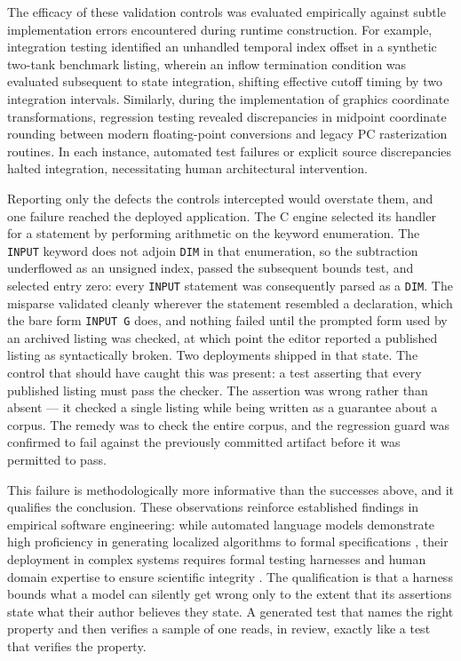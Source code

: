 \documentclass[3p,times,authoryear,twocolumn]{elsarticle}
\begin{document}
The efficacy of these validation controls was evaluated empirically against subtle implementation errors encountered during runtime construction. For example, integration testing identified an unhandled temporal index offset in a synthetic two-tank benchmark listing, wherein an inflow termination condition was evaluated subsequent to state integration, shifting effective cutoff timing by two integration intervals. Similarly, during the implementation of graphics coordinate transformations, regression testing revealed discrepancies in midpoint coordinate rounding between modern floating-point conversions and legacy PC rasterization routines. In each instance, automated test failures or explicit source discrepancies halted integration, necessitating human architectural intervention.

Reporting only the defects the controls intercepted would overstate them, and one failure reached the deployed application. The C engine selected its handler for a statement by performing arithmetic on the keyword enumeration. The \texttt{INPUT} keyword does not adjoin \texttt{DIM} in that enumeration, so the subtraction underflowed as an unsigned index, passed the subsequent bounds test, and selected entry zero: every \texttt{INPUT} statement was consequently parsed as a \texttt{DIM}. The misparse validated cleanly wherever the statement resembled a declaration, which the bare form \texttt{INPUT G} does, and nothing failed until the prompted form used by an archived listing was checked, at which point the editor reported a published listing as syntactically broken. Two deployments shipped in that state. The control that should have caught this was present: a test asserting that every published listing must pass the checker. The assertion was wrong rather than absent --- it checked a single listing while being written as a guarantee about a corpus. The remedy was to check the entire corpus, and the regression guard was confirmed to fail against the previously committed artifact before it was permitted to pass.

This failure is methodologically more informative than the successes above, and it qualifies the conclusion. These observations reinforce established findings in empirical software engineering: while automated language models demonstrate high proficiency in generating localized algorithms to formal specifications \citep{chen2021}, their deployment in complex systems requires formal testing harnesses and human domain expertise to ensure scientific integrity \citep{jimenez2024}. The qualification is that a harness bounds what a model can silently get wrong only to the extent that its assertions state what their author believes they state. A generated test that names the right property and then verifies a sample of one reads, in review, exactly like a test that verifies the property.
\end{document}
